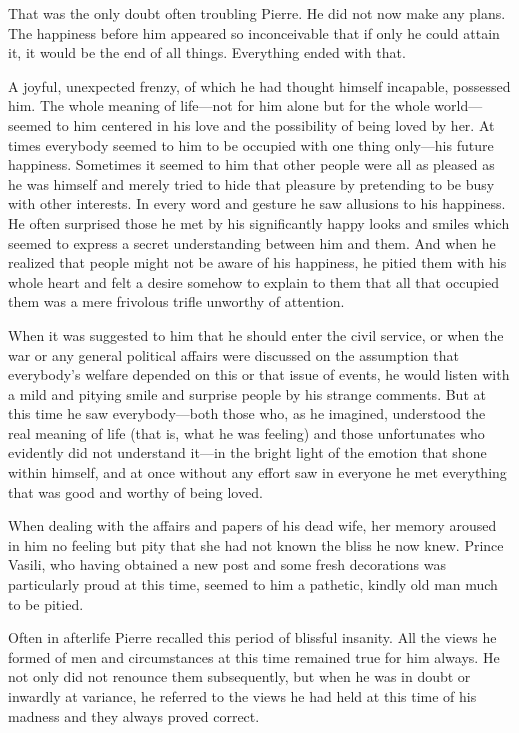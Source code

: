 That was the only doubt often troubling Pierre. He did not now
make any plans. The happiness before him appeared so
inconceivable that if only he could attain it, it would be the
end of all things. Everything ended with that.

A joyful, unexpected frenzy, of which he had thought himself
incapable, possessed him. The whole meaning of life---not for him
alone but for the whole world---seemed to him centered in his
love and the possibility of being loved by her. At times
everybody seemed to him to be occupied with one thing only---his
future happiness. Sometimes it seemed to him that other people
were all as pleased as he was himself and merely tried to hide
that pleasure by pretending to be busy with other interests. In
every word and gesture he saw allusions to his happiness. He
often surprised those he met by his significantly happy looks and
smiles which seemed to express a secret understanding between him
and them. And when he realized that people might not be aware of
his happiness, he pitied them with his whole heart and felt a
desire somehow to explain to them that all that occupied them was
a mere frivolous trifle unworthy of attention.

When it was suggested to him that he should enter the civil
service, or when the war or any general political affairs were
discussed on the assumption that everybody's welfare depended on
this or that issue of events, he would listen with a mild and
pitying smile and surprise people by his strange comments. But at
this time he saw everybody---both those who, as he imagined,
understood the real meaning of life (that is, what he was
feeling) and those unfortunates who evidently did not understand
it---in the bright light of the emotion that shone within
himself, and at once without any effort saw in everyone he met
everything that was good and worthy of being loved.

When dealing with the affairs and papers of his dead wife, her
memory aroused in him no feeling but pity that she had not known
the bliss he now knew. Prince Vasili, who having obtained a new
post and some fresh decorations was particularly proud at this
time, seemed to him a pathetic, kindly old man much to be pitied.

Often in afterlife Pierre recalled this period of blissful
insanity. All the views he formed of men and circumstances at
this time remained true for him always. He not only did not
renounce them subsequently, but when he was in doubt or inwardly
at variance, he referred to the views he had held at this time of
his madness and they always proved correct.

